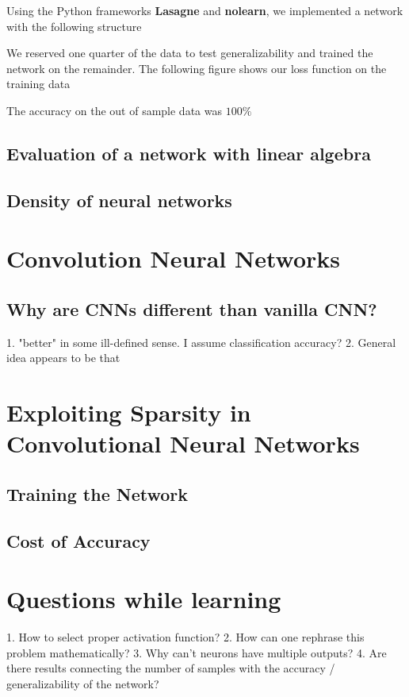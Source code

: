\documentclass[12pt,letterpaper,boxed]{article}
\begin{document}
Using the Python frameworks \textbf{Lasagne} and \textbf{nolearn}, we implemented a network with the following structure


We reserved one quarter of the data to test generalizability and trained the network on the remainder. The following figure shows our loss function on the training data


The accuracy on the out of sample data was $100\%$

\subsection{Evaluation of a network with linear algebra}

\subsection{Density of neural networks}

\section{Convolution Neural Networks}

\subsection{Why are CNNs different than vanilla CNN?}
1. "better" in some ill-defined sense. I assume classification accuracy?
2. General idea appears to be that

\section{Exploiting Sparsity in Convolutional Neural Networks}

	\subsection{Training the Network}

	\subsection{Cost of Accuracy}

\section{Questions while learning}
1. How to select proper activation function?
2. How can one rephrase this problem mathematically?
3. Why can't neurons have multiple outputs?
4. Are there results connecting the number of samples with the accuracy / generalizability of the network?
\end{document}
